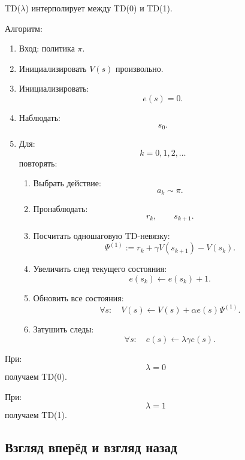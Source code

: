 \documentclass[12pt,a4paper]{article}
\begin{document}
TD($\lambda$) интерполирует между TD(0) и TD(1).

Алгоритм:

\begin{enumerate}
    \item Вход: политика $\pi$.

    \item Инициализировать $V(s)$ произвольно.

    \item Инициализировать:
    \[
    e(s)=0.
    \]

    \item Наблюдать:
    \[
    s_0.
    \]

    \item Для:
    \[
    k=0,1,2,\ldots
    \]
    повторять:
    \begin{enumerate}
        \item Выбрать действие:
        \[
        a_k\sim\pi.
        \]

        \item Пронаблюдать:
        \[
        r_k,
        \qquad
        s_{k+1}.
        \]

        \item Посчитать одношаговую TD-невязку:
        \[
        \Psi^{(1)}
        :=
        r_k+\gamma V(s_{k+1})-V(s_k).
        \]

        \item Увеличить след текущего состояния:
        \[
        e(s_k)
        \leftarrow
        e(s_k)+1.
        \]

        \item Обновить все состояния:
        \[
        \forall s:
        \quad
        V(s)
        \leftarrow
        V(s)
        +
        \alpha e(s)\Psi^{(1)}.
        \]

        \item Затушить следы:
        \[
        \forall s:
        \quad
        e(s)
        \leftarrow
        \lambda\gamma e(s).
        \]
    \end{enumerate}
\end{enumerate}

При:
\[
\lambda=0
\]
получаем TD(0).

При:
\[
\lambda=1
\]
получаем TD(1).

\subsection{Взгляд вперёд и взгляд назад}
\end{document}

